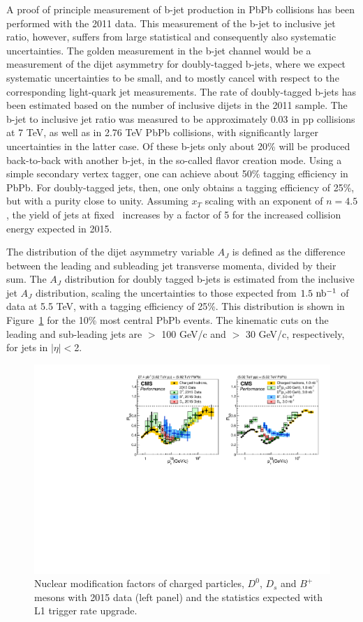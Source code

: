 A proof of principle measurement of b-jet production in PbPb collisions has
been performed with the 2011 data.  
This measurement of the b-jet to inclusive jet ratio, however, suffers from
large statistical and consequently also systematic uncertainties.  
The golden measurement in the b-jet channel would be a measurement of the
dijet asymmetry for doubly-tagged b-jets, 
where we expect systematic uncertainties to be small, and to mostly cancel
with respect to the corresponding light-quark jet measurements.  
The rate of doubly-tagged b-jets has been estimated based on the number
of inclusive dijets in the 2011 sample.  
The b-jet to inclusive jet ratio was measured to be approximately 0.03 in pp
collisions at 7 TeV, as well as in 2.76 TeV PbPb collisions, with 
significantly larger uncertainties in the latter case.  Of these b-jets only
about 20\% will be produced back-to-back with another b-jet, 
in the so-called flavor creation mode.  Using a simple secondary vertex
tagger, one can achieve about 50\% tagging efficiency in PbPb.  
For doubly-tagged jets, then, one only obtains a tagging efficiency of 25\%,
but with a purity close to unity.  
Assuming $x_{T}$ scaling with an exponent of $n = 4.5$, the yield of jets at
fixed \pt\ increases by a factor of 5 for the increased collision energy 
expected in 2015.  

The distribution of the dijet asymmetry variable $A_{J}$ is defined as the
difference between the leading and subleading jet transverse momenta,
divided by their sum.  
The $A_{J}$ distribution for doubly tagged b-jets is estimated from the
inclusive jet $A_{J}$ distribution, 
scaling the uncertainties to those expected from $1.5\ {\rm nb^{-1}}$ of data at
5.5 TeV, with a tagging efficiency of 25\%.  This distribution is shown in
Figure~\ref{fig:aj_2015} for the 10\% most central PbPb events.  
The kinematic cuts on the leading and sub-leading jets are \pt $>$ 100 GeV/c
and \pt $>$ 30 GeV/c, respectively, for jets in $|\eta| < $2.  


\begin{figure}[!ht]
\begin{center}
\includegraphics[width=.90\textwidth]{figures/cRAA_lumiTG_3_lumiMB_1.pdf}
\caption{Nuclear modification factors of charged particles, $D^0$, $D_s$ and $B^+$ mesons with 2015 data (left panel) and the statistics expected with L1 trigger rate upgrade.}
\label{fig:aj_2015}
\end{center}
\end{figure}

